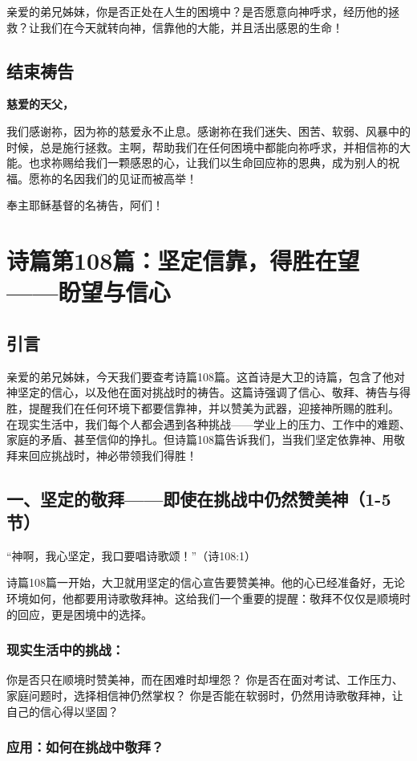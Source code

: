 \documentclass[a4paper, 12pt]{article}
\begin{document}
亲爱的弟兄姊妹，你是否正处在人生的困境中？是否愿意向神呼求，经历他的拯救？让我们在今天就转向神，信靠他的大能，并且活出感恩的生命！

\subsection*{结束祷告}
\textbf{慈爱的天父，}

我们感谢祢，因为祢的慈爱永不止息。感谢祢在我们迷失、困苦、软弱、风暴中的时候，总是施行拯救。主啊，帮助我们在任何困境中都能向祢呼求，并相信祢的大能。也求祢赐给我们一颗感恩的心，让我们以生命回应祢的恩典，成为别人的祝福。愿祢的名因我们的见证而被高举！

奉主耶稣基督的名祷告，阿们！
\newpage
\section{诗篇第108篇：坚定信靠，得胜在望——盼望与信心}
\subsection*{引言}
亲爱的弟兄姊妹，今天我们要查考诗篇108篇。这首诗是大卫的诗篇，包含了他对神坚定的信心，以及他在面对挑战时的祷告。这篇诗强调了信心、敬拜、祷告与得胜，提醒我们在任何环境下都要信靠神，并以赞美为武器，迎接神所赐的胜利。
在现实生活中，我们每个人都会遇到各种挑战——学业上的压力、工作中的难题、家庭的矛盾、甚至信仰的挣扎。但诗篇108篇告诉我们，当我们坚定依靠神、用敬拜来回应挑战时，神必带领我们得胜！

\subsection*{一、坚定的敬拜——即使在挑战中仍然赞美神（1-5节）}
“神啊，我心坚定，我口要唱诗歌颂！”（诗108:1）

诗篇108篇一开始，大卫就用坚定的信心宣告要赞美神。他的心已经准备好，无论环境如何，他都要用诗歌敬拜神。这给我们一个重要的提醒：敬拜不仅仅是顺境时的回应，更是困境中的选择。

\subsubsection*{现实生活中的挑战：}

你是否只在顺境时赞美神，而在困难时却埋怨？
你是否在面对考试、工作压力、家庭问题时，选择相信神仍然掌权？
你是否能在软弱时，仍然用诗歌敬拜神，让自己的信心得以坚固？
\subsubsection*{应用：如何在挑战中敬拜？}
\end{document}
